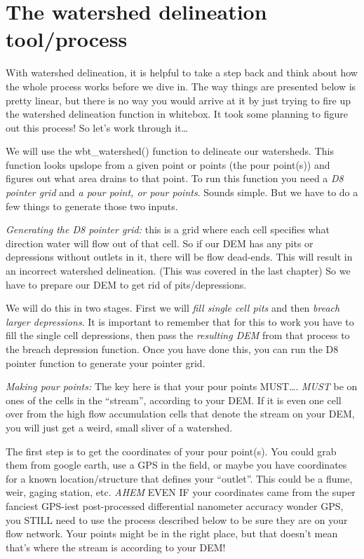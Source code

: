 \documentclass[
]{book}
\begin{document}
\hypertarget{the-watershed-delineation-toolprocess}{%
\section{The watershed delineation tool/process}\label{the-watershed-delineation-toolprocess}}

With watershed delineation, it is helpful to take a step back and think about how the whole process works before we dive in. The way things are presented below is pretty linear, but there is no way you would arrive at it by just trying to fire up the watershed delineation function in whitebox. It took some planning to figure out this process! So let's work through it\ldots{}

We will use the wbt\_watershed() function to delineate our watersheds. This function looks upslope from a given point or points (the pour point(s)) and figures out what area drains to that point. To run this function you need a \emph{D8 pointer grid} and \emph{a pour point, or pour points}. Sounds simple. But we have to do a few things to generate those two inputs.

\emph{Generating the D8 pointer grid:} this is a grid where each cell specifies what direction water will flow out of that cell. So if our DEM has any pits or depressions without outlets in it, there will be flow dead-ends. This will result in an incorrect watershed delineation. (This was covered in the last chapter) So we have to prepare our DEM to get rid of pits/depressions.

We will do this in two stages. First we will \emph{fill single cell pits} and then \emph{breach larger depressions}. It is important to remember that for this to work you have to fill the single cell depressions, then pass the \emph{resulting DEM} from that process to the breach depression function. Once you have done this, you can run the D8 pointer function to generate your pointer grid.

\emph{Making pour points:} The key here is that your pour points MUST\ldots. \emph{MUST} be on ones of the cells in the ``stream'', according to your DEM. If it is even one cell over from the high flow accumulation cells that denote the stream on your DEM, you will just get a weird, small sliver of a watershed.

The first step is to get the coordinates of your pour point(s). You could grab them from google earth, use a GPS in the field, or maybe you have coordinates for a known location/structure that defines your ``outlet''. This could be a flume, weir, gaging station, etc. \emph{AHEM} EVEN IF your coordinates came from the super fanciest GPS-iest post-processed differential nanometer accuracy wonder GPS, you STILL need to use the process described below to be sure they are on your flow network. Your points might be in the right place, but that doesn't mean that's where the stream is according to your DEM!
\end{document}
